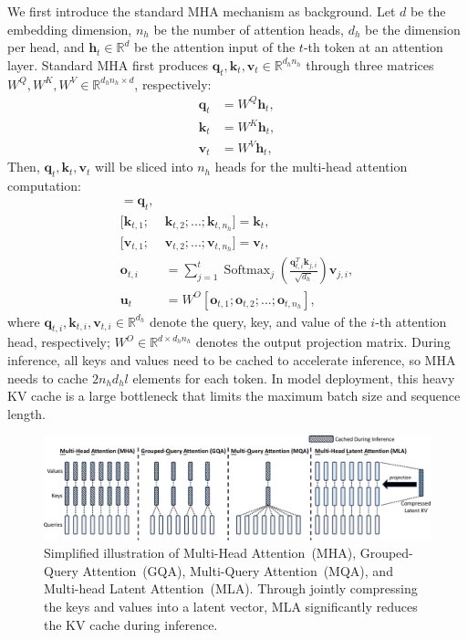 \documentclass[11pt, a4paper, logo, copyright, nonumbering]{deepseek}
\newcommand{\dsattn}{MLA}
\begin{document}
\begin{CJK*}{UTF8}{gbsn}
We first introduce the standard MHA mechanism as background. 
Let $d$ be the embedding dimension, $n_h$ be the number of attention heads, $d_h$ be the dimension per head, and $\mathbf{h}_{t} \in \mathbb{R}^{d}$ be the attention input of the $t$-th token at an attention layer. 
Standard MHA first produces $\mathbf{q}_{t}, \mathbf{k}_{t}, \mathbf{v}_{t} \in \mathbb{R}^{d_h n_h}$ through three matrices $W^{Q}, W^{K}, W^{V} \in \mathbb{R}^{d_h n_h \times d}$, respectively: 
\begin{align}
    \mathbf{q}_{t} &= W^{Q} \mathbf{h}_{t}, \\
    \mathbf{k}_{t} &= W^{K} \mathbf{h}_{t}, \\
    \mathbf{v}_{t} &= W^{V} \mathbf{h}_{t},
\end{align}
Then, $\mathbf{q}_{t}, \mathbf{k}_{t}, \mathbf{v}_{t}$ will be sliced into $n_h$ heads for the multi-head attention computation: 
\begin{align}
    [\mathbf{q}_{t, 1};&\mathbf{q}_{t, 2};...;\mathbf{q}_{t, n_{h}}] = \mathbf{q}_{t}, \\
    [\mathbf{k}_{t, 1};&\mathbf{k}_{t, 2};...;\mathbf{k}_{t, n_{h}}] = \mathbf{k}_{t}, \\
    [\mathbf{v}_{t, 1};&\mathbf{v}_{t, 2};...;\mathbf{v}_{t, n_{h}}] = \mathbf{v}_{t}, \\
    \mathbf{o}_{t, i} &= \sum_{j=1}^{t} \operatorname{Softmax}_j(\frac{\mathbf{q}_{t, i}^T \mathbf{k}_{j, i}}{\sqrt{d_{h}}}) \mathbf{v}_{j, i}, \\ 
    \mathbf{u}_{t} &= W^{O} [\mathbf{o}_{t, 1};\mathbf{o}_{t, 2};...;\mathbf{o}_{t, n_{h}}],
\end{align}
where $\mathbf{q}_{t, i}, \mathbf{k}_{t, i}, \mathbf{v}_{t, i} \in \mathbb{R}^{d_h}$ denote the query, key, and value of the $i$-th attention head, respectively; 
$W^{O} \in \mathbb{R}^{d \times d_h n_h}$ denotes the output projection matrix. 
During inference, all keys and values need to be cached to accelerate inference, so MHA needs to cache $2 n_{h} d_{h} l$ elements for each token. 
In model deployment, this heavy KV cache is a large bottleneck that limits the maximum batch size and sequence length. 

\begin{figure}[!t]
\centering
\includegraphics[width=0.99\linewidth]{figures/dsattn.pdf}
\caption{
Simplified illustration of Multi-Head Attention~(MHA), Grouped-Query Attention~(GQA), Multi-Query Attention~(MQA), and Multi-head Latent Attention~(\dsattn{}).  
Through jointly compressing the keys and values into a latent vector, \dsattn{} significantly reduces the KV cache during inference. 
}
\label{fig:dsattn}
\end{figure}


\end{CJK*}
\end{document}
